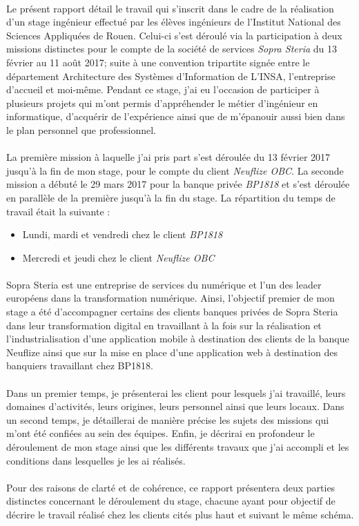 \paragraph{}
Le présent rapport détail le travail qui s’inscrit dans le cadre de la réalisation d’un stage ingénieur effectué par les élèves ingénieurs de l’Institut National des Sciences Appliquées de Rouen. Celui-ci s’est déroulé via la participation à deux missions distinctes pour le compte de la société de services \textit{Sopra Steria} du 13 février au 11 août 2017; suite à une convention tripartite signée entre le département Architecture des Systèmes d’Information de L’INSA, l’entreprise d’accueil et moi-même. Pendant ce stage, j’ai eu l’occasion de participer à plusieurs projets qui m’ont permis d’appréhender le métier d’ingénieur en informatique, d’acquérir de l’expérience ainsi que de m’épanouir aussi bien dans le plan personnel que professionnel.

\paragraph{}
La première mission à laquelle j'ai pris part s'est déroulée du 13 février 2017 jusqu'à la fin de mon stage, pour le compte du client \textit{Neuflize OBC}. La seconde mission a débuté le 29 mars 2017 pour la banque privée \textit{BP1818} et s'est déroulée en parallèle de la première jusqu'à la fin du stage. La répartition du temps de travail était la suivante :
\begin{itemize}
	\item Lundi, mardi et vendredi chez le client \textit{BP1818}
	\item Mercredi et jeudi chez le client \textit{Neuflize OBC}
\end{itemize}

\paragraph{}
Sopra Steria est une entreprise de services du numérique et l'un des leader européens dans la transformation numérique. Ainsi, l'objectif premier de mon stage a été d'accompagner certains des clients banques privées de Sopra Steria dans leur transformation digital en travaillant à la fois sur la réalisation et l'industrialisation d'une application mobile à destination des clients de la banque Neuflize ainsi que sur la mise en place d'une application web à destination des banquiers travaillant chez BP1818.

\paragraph{}
Dans un premier temps, je présenterai les client pour lesquels j'ai travaillé, leurs domaines d’activités, leurs origines, leurs personnel ainsi que leurs locaux.
Dans un second temps, je détaillerai de manière précise les sujets des missions qui m’ont été confiées au sein des équipes.
Enfin, je décrirai en profondeur le déroulement de mon stage ainsi que les différents travaux que j’ai accompli et les conditions dans lesquelles je les ai réalisés. 

\paragraph{}
Pour des raisons de clarté et de cohérence, ce rapport présentera deux parties distinctes concernant le déroulement du stage, chacune ayant pour objectif de décrire le travail réalisé chez les clients cités plus haut et suivant le même schéma.
